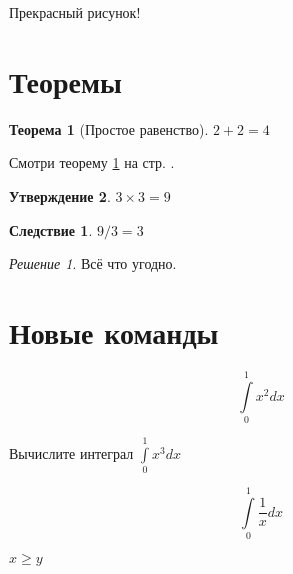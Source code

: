 \documentclass[a4paper,14pt]{extarticle}
\begin{document}
Прекрасный рисунок!


\theoremstyle{plain} %
\newtheorem{theorem}{Теорема}[section]
\newtheorem{proposition}[theorem]{Утверждение}

\theoremstyle{definition} %
\newtheorem{corollary}{Следствие}[theorem]
\newtheorem{problem}{Задача}[section]

\theoremstyle{remark} %
\newtheorem*{nonum}{Решение}

\section{Теоремы}

\begin{theorem}[Простое равенство]\label{theorem1}
	$2+2=4$
\end{theorem}

Смотри теорему \ref{theorem1} на стр. \pageref{theorem1}.

\begin{proposition}
	$3\times 3 = 9$
\end{proposition}

\begin{corollary}
	$9/3 = 3$
\end{corollary}

\begin{nonum}
	Всё что угодно.
\end{nonum}

\section{Новые команды}

\newcommand{\nw}[1]{\int\limits_0^1 #1 dx}

\begin{equation}\label{pref}
	\nw{x^2}
\end{equation}

Вычислите интеграл $\nw{x^3}$

\newcommand{\str}[1]{%
	на стр. \pageref{#1}%
}

\newcommand{\myint}[2][x]{
	\begin{equation}
		\int\limits_0^1 #2 d #1
	\end{equation}
}

\myint{\frac{1}{x}}

$x\ge y$

\renewcommand{\ge}{\geqslant}
\end{document}

